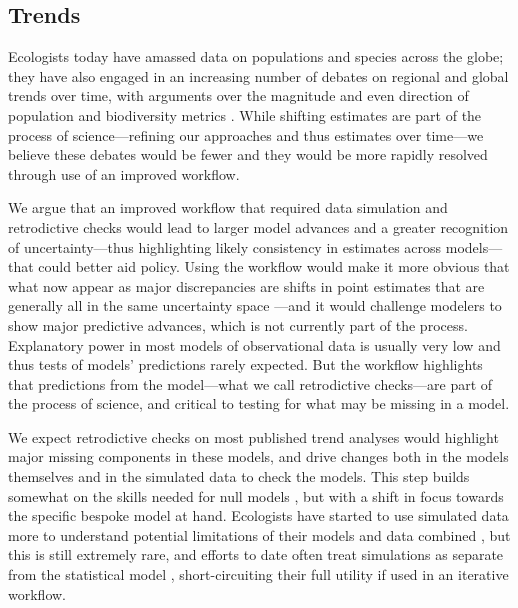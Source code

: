 \documentclass[11pt]{article}
\begin{document}
\subsection{Trends}

Ecologists today have amassed data on populations and species across the globe; they have also engaged in an increasing number of debates on regional and global trends over time, with arguments over the magnitude and even direction of population and biodiversity metrics \citep{Dornelas2014,Leung2020,terry2022no,muller2024weather}. While shifting estimates are part of the process of science---refining our approaches and thus estimates over time---we believe these debates would be fewer and they would be more rapidly resolved through use of an improved workflow. %

We argue that an improved workflow that required data simulation and retrodictive checks would lead to larger model advances and a greater recognition of uncertainty---thus highlighting likely consistency in estimates across models---that could better aid policy.  Using the workflow would make it more obvious that what now appear as major discrepancies are shifts in point estimates that are generally all in the same uncertainty space \citep{Johnson2024}---and it would challenge modelers to show major predictive advances, which is not currently part of the process. Explanatory power in most models of observational data is usually very low \citep{low2014rising,moller2002much} and thus tests of models' predictions rarely expected. But the workflow highlights that predictions from the model---what we call retrodictive checks---are part of the process of science, and critical to testing for what may be missing in a model. 

We expect retrodictive checks on most published trend analyses would highlight major missing components in these models, and drive changes both in the models themselves and in the simulated data to check the models. This step builds somewhat on the skills needed for null models \citep{Gotelli:2012oz}, but with a shift in focus towards the specific bespoke model at hand. Ecologists have started to use simulated data more to understand potential limitations of their models and data combined \citep{Hilborn1997}, but this is still extremely rare, and efforts to date often treat simulations as separate from the statistical model \citep{Buschke2021,dove2023quantifying}, short-circuiting their full utility if used in an iterative workflow.
\end{document}

